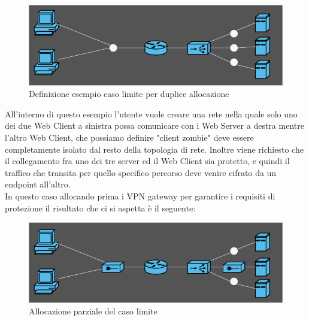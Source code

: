 \begin{figure}[h]  %
    \centering
    \includegraphics[width=1\textwidth]{CasoLimite.png}  %
    \caption{Definizione esempio caso limite per duplice allocazione}
    \label{fig:CasoLimite1}
\end{figure}

All'interno di questo esempio l'utente vuole creare una rete nella quale solo uno dei due Web Client a sinistra possa comunicare con i Web Server a destra mentre l'altro Web Client,
che possiamo definire "client zombie" deve essere completamente isolato dal resto della topologia di rete. Inoltre viene richiesto che il collegamento fra uno dei tre server ed il Web Client
sia protetto, e quindi il traffico che transita per quello specifico percorso deve venire cifrato da un endpoint all'altro.\\
In questo caso allocando prima i VPN gateway per garantire i requisiti di protezione il risultato che ci si aspetta è il seguente:


\begin{figure}[h]  %
    \centering
    \includegraphics[width=1\textwidth]{CasoLimite2.png}  %
    \caption{Allocazione parziale del caso limite}
    \label{fig:CasoLimite2}
\end{figure}

